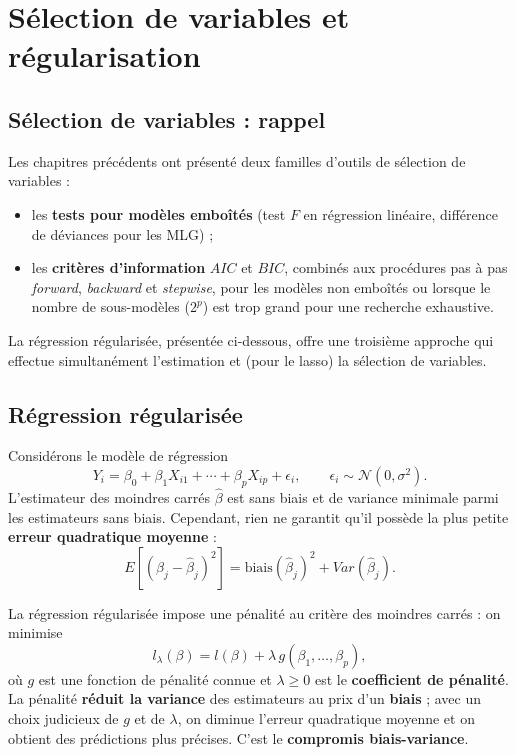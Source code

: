 \documentclass[
  french,
  letterpaper,
  DIV=11,
  numbers=noendperiod]{scrreprt}
\begin{document}

\chapter{Sélection de variables et
régularisation}\label{sec-regularisation}

\section{Sélection de variables :
rappel}\label{suxe9lection-de-variables-rappel}

Les chapitres précédents ont présenté deux familles d'outils de
sélection de variables :

\begin{itemize}
\item
  les \textbf{tests pour modèles emboîtés} (test \(F\) en régression
  linéaire, différence de déviances pour les MLG) ;
\item
  les \textbf{critères d'information} \(AIC\) et \(BIC\), combinés aux
  procédures pas à pas \emph{forward}, \emph{backward} et
  \emph{stepwise}, pour les modèles non emboîtés ou lorsque le nombre de
  sous-modèles (\(2^p\)) est trop grand pour une recherche exhaustive.
\end{itemize}

La régression régularisée, présentée ci-dessous, offre une troisième
approche qui effectue simultanément l'estimation et (pour le lasso) la
sélection de variables.

\section{Régression régularisée}\label{ruxe9gression-ruxe9gularisuxe9e}

Considérons le modèle de régression
\[Y_i = \beta_0 + \beta_1 X_{i1} + \cdots + \beta_p X_{ip} + \epsilon_i, \qquad \epsilon_i \sim \mathcal{N}(0,\sigma^2).\]
L'estimateur des moindres carrés \(\hat\beta\) est sans biais et de
variance minimale parmi les estimateurs sans biais. Cependant, rien ne
garantit qu'il possède la plus petite \textbf{erreur quadratique
moyenne} :
\[E\left[(\beta_j - \hat\beta_j)^2\right] = \mbox{biais}(\hat\beta_j)^2 + Var(\hat\beta_j).\]

La régression régularisée impose une pénalité au critère des moindres
carrés : on minimise
\[l_\lambda(\beta) = l(\beta) + \lambda\, g(\beta_1,\ldots,\beta_p),\]
où \(g\) est une fonction de pénalité connue et \(\lambda \geq 0\) est
le \textbf{coefficient de pénalité}. La pénalité \textbf{réduit la
variance} des estimateurs au prix d'un \textbf{biais} ; avec un choix
judicieux de \(g\) et de \(\lambda\), on diminue l'erreur quadratique
moyenne et on obtient des prédictions plus précises. C'est le
\textbf{compromis biais-variance}.
\end{document}
